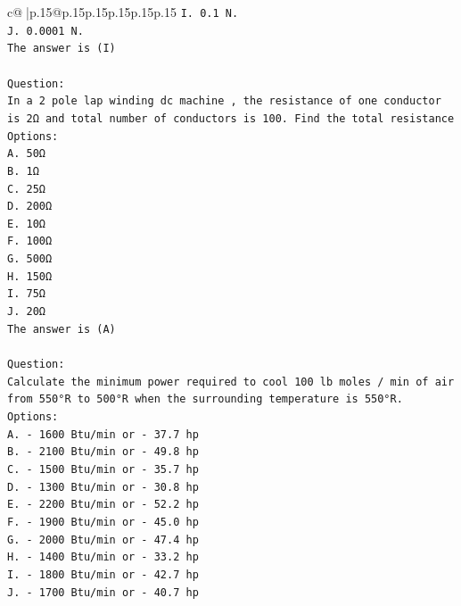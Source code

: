 \documentclass{article}
\begin{document}
{\begin{supertabular}{c@{$\;$}|p{.15\linewidth}@{}p{.15\linewidth}p{.15\linewidth}p{.15\linewidth}p{.15\linewidth}p{.15\linewidth}}
{{{\texttt{I. 0.1 N.} \\
\texttt{J. 0.0001 N.} \\
\texttt{The answer is (I)} \\
\\ 
\texttt{Question:} \\
\texttt{In a 2 pole lap winding dc machine , the resistance of one conductor is 2Ω and total number of conductors is 100. Find the total resistance} \\
\texttt{Options:} \\
\texttt{A. 50Ω} \\
\texttt{B. 1Ω} \\
\texttt{C. 25Ω} \\
\texttt{D. 200Ω} \\
\texttt{E. 10Ω} \\
\texttt{F. 100Ω} \\
\texttt{G. 500Ω} \\
\texttt{H. 150Ω} \\
\texttt{I. 75Ω} \\
\texttt{J. 20Ω} \\
\texttt{The answer is (A)} \\
\\ 
\texttt{Question:} \\
\texttt{Calculate the minimum power required to cool 100 lb moles / min of air from 550°R to 500°R when the surrounding temperature is 550°R.} \\
\texttt{Options:} \\
\texttt{A. {-} 1600 Btu/min or {-} 37.7 hp} \\
\texttt{B. {-} 2100 Btu/min or {-} 49.8 hp} \\
\texttt{C. {-} 1500 Btu/min or {-} 35.7 hp} \\
\texttt{D. {-} 1300 Btu/min or {-} 30.8 hp} \\
\texttt{E. {-} 2200 Btu/min or {-} 52.2 hp} \\
\texttt{F. {-} 1900 Btu/min or {-} 45.0 hp} \\
\texttt{G. {-} 2000 Btu/min or {-} 47.4 hp} \\
\texttt{H. {-} 1400 Btu/min or {-} 33.2 hp} \\
\texttt{I. {-} 1800 Btu/min or {-} 42.7 hp} \\
\texttt{J. {-} 1700 Btu/min or {-} 40.7 hp} \\
            }
        }
    }
     \\ \\


\end{supertabular}}
\end{document}
